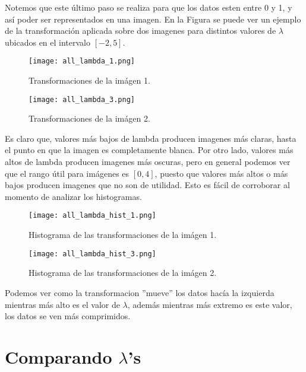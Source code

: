     Notemos que este \'ultimo paso se realiza para que los datos esten entre 0 y 1, y as\'i poder ser representados en una imagen. En la Figura se puede ver un ejemplo de la transformaci\'on aplicada sobre dos imagenes para distintos valores de $\lambda$ ubicados en el intervalo $[-2,5]$.

    \begin{figure}[H]
        \centering
        \texttt{[image: all\_lambda\_1.png]}
        \caption{Transformaciones de la im\'agen 1.}
        \label{fig:all_lambda_1}
    \end{figure}

    \begin{figure}[H]
        \centering
        \texttt{[image: all\_lambda\_3.png]}
        \caption{Transformaciones de la im\'agen 2.}
        \label{fig:all_lambda_1}
    \end{figure}

    Es claro que, valores m\'as bajos de lambda producen imagenes m\'as claras, hasta el punto en que la imagen es completamente blanca. Por otro lado, valores m\'as altos de lambda producen imagenes m\'as oscuras, pero en general podemos ver que el rango \'util para im\'agenes es $[0,4]$, puesto que valores m\'as altos o m\'as bajos producen imagenes que no son de utilidad. Esto es f\'acil de corroborar al momento de analizar los histogramas. 

    \begin{figure}[H]
        \centering
        \texttt{[image: all\_lambda\_hist\_1.png]}
        \caption{Histograma de las transformaciones de la im\'agen 1.}
        \label{fig:img_bci_hist_1}
    \end{figure}

    \begin{figure}[H]
        \centering
        \texttt{[image: all\_lambda\_hist\_3.png]}
        \caption{Histograma de las transformaciones de la im\'agen 2.}
        \label{fig:img_bci_hist_2}
    \end{figure}
    Podemos ver como la transformacion ''mueve'' los datos hac\'ia la izquierda mientras m\'as alto es el valor de $\lambda$, adem\'as mientras m\'as extremo es este valor, los datos se ven m\'as comprimidos.  

   

    \section[comparando lambdas]{Comparando $\lambda$'s}

